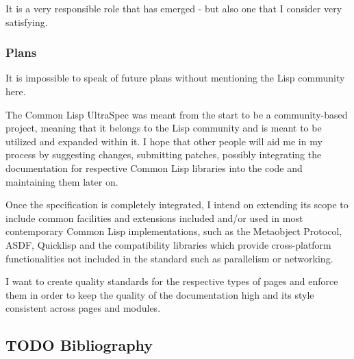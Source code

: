 \documentclass[11pt]{article}
\begin{document}
It is a very responsible role that has emerged - but also one that I consider very satisfying.
\subsubsection{Plans}
\label{sec:orgaf68cfe}
It is impossible to speak of future plans without mentioning the Lisp community here.

The Common Lisp UltraSpec was meant from the start to be a community-based project, meaning that it belongs to the Lisp community and is meant to be utilized and expanded within it. I hope that other people will aid me in my process by suggesting changes, submitting patches, possibly integrating the documentation for respective Common Lisp libraries into the code and maintaining them later on.

Once the specification is completely integrated, I intend on extending its scope to include common facilities and extensions included and/or used in most contemporary Common Lisp implementations, such as the Metaobject Protocol, ASDF, Quicklisp and the compatibility libraries which provide cross-platform functionalities not included in the standard such as parallelism or networking.

I want to create quality standards for the respective types of pages and enforce them in order to keep the quality of the documentation high and its style consistent across pages and modules.
\subsection{{\bfseries\sffamily TODO} Bibliography}
\label{sec:orgc315698}
\end{document}
